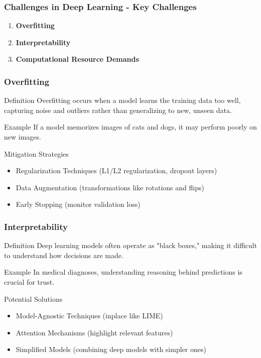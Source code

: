 \documentclass[aspectratio=169]{beamer}
\begin{document}
\begin{frame}[fragile]
    \frametitle{Challenges in Deep Learning - Key Challenges}
    \begin{enumerate}
        \item \textbf{Overfitting}
        \item \textbf{Interpretability}
        \item \textbf{Computational Resource Demands}
    \end{enumerate}
\end{frame}

\begin{frame}[fragile]
    \frametitle{Overfitting}
    \begin{block}{Definition}
        Overfitting occurs when a model learns the training data too well, capturing noise and outliers rather than generalizing to new, unseen data.
    \end{block}
    \begin{block}{Example}
        If a model memorizes images of cats and dogs, it may perform poorly on new images.
    \end{block}
    \begin{block}{Mitigation Strategies}
        \begin{itemize}
            \item Regularization Techniques (L1/L2 regularization, dropout layers)
            \item Data Augmentation (transformations like rotations and flips)
            \item Early Stopping (monitor validation loss)
        \end{itemize}
    \end{block}
\end{frame}

\begin{frame}[fragile]
    \frametitle{Interpretability}
    \begin{block}{Definition}
        Deep learning models often operate as "black boxes," making it difficult to understand how decisions are made.
    \end{block}
    \begin{block}{Example}
        In medical diagnoses, understanding reasoning behind predictions is crucial for trust.
    \end{block}
    \begin{block}{Potential Solutions}
        \begin{itemize}
            \item Model-Agnostic Techniques (inplace like LIME)
            \item Attention Mechanisms (highlight relevant features)
            \item Simplified Models (combining deep models with simpler ones)
        \end{itemize}
    \end{block}
\end{frame}
\end{document}
